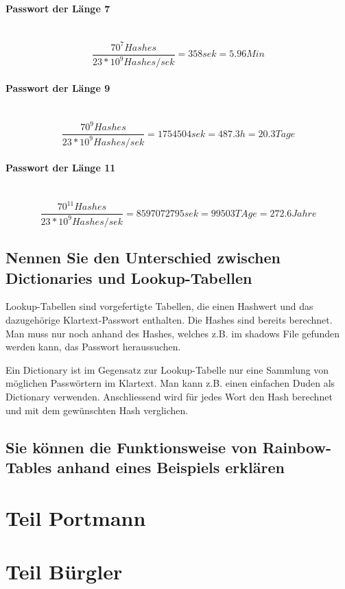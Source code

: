 \documentclass[a4paper, 11pt, nofootinbib]{article}
\begin{document}
\paragraph{Passwort der Länge 7}\mbox{}\\
\begin{equation}
\dfrac{70^{7}  Hashes}{23*10^{9}   Hashes/sek} = 358sek = 5.96 Min
\end{equation} 

\paragraph{Passwort der Länge 9}\mbox{}\\
\begin{equation}
\dfrac{70^{9}  Hashes}{23*10^{9}   Hashes/sek} = 1754504sek = 487.3h = 20.3 Tage
\end{equation} 

\paragraph{Passwort der Länge 11}\mbox{}\\
\begin{equation}
\dfrac{70^{11}  Hashes}{23*10^{9}   Hashes/sek} = 8597072795sek  = 99503 TAge = 272.6 Jahre
\end{equation} 

\subsection{Nennen Sie den Unterschied zwischen Dictionaries und Lookup-Tabellen}
Lookup-Tabellen sind vorgefertigte Tabellen, die einen Hashwert und das dazugehörige Klartext-Passwort enthalten. Die Hashes sind bereits berechnet. Man muss nur noch anhand des Hashes, welches z.B. im shadows File gefunden werden kann, das Passwort heraussuchen. 

Ein Dictionary ist im Gegensatz zur Lookup-Tabelle nur eine Sammlung von möglichen Passwörtern im Klartext. Man kann z.B. einen einfachen Duden als Dictionary verwenden. Anschliessend wird für jedes Wort den Hash berechnet und mit dem gewünschten Hash verglichen.

\subsection{Sie können die Funktionsweise von Rainbow-Tables anhand eines Beispiels erklären}


\section{Teil Portmann}

\section{Teil Bürgler}
\end{document}
